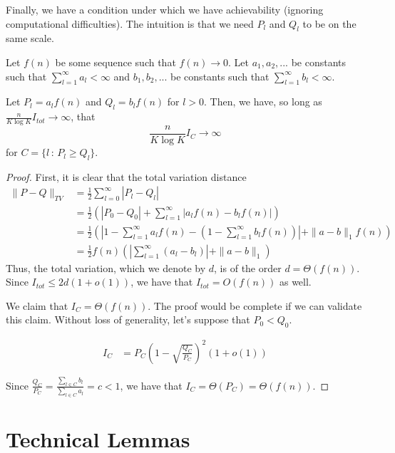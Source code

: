 \documentclass{article}
\begin{document}
Finally, we have a condition under which we have achievability (ignoring computational difficulties). The intuition is that we need $P_l$ and $Q_l$ to be on the same scale.

\begin{proposition}
Let $f(n)$ be some sequence such that $f(n) \rightarrow 0$. Let $a_1, a_2, ...$ be constants such that $\sum_{l=1}^\infty a_l < \infty$ and $b_1, b_2, ...$ be constants such that $\sum_{l=1}^\infty b_l < \infty$.

Let $P_l = a_l f(n)$ and $Q_l = b_l f(n)$ for $l > 0$. Then, we have, so long as $\frac{n}{K \log K} I_{tot} \rightarrow \infty$, that
\[
\frac{n}{K\log K} I_C \rightarrow \infty
\]
for $C = \{ l \,:\, P_l \geq Q_l \}$. 
\end{proposition}

\begin{proof}
First, it is clear that the total variation distance 
\begin{align*}
\| P - Q \|_{TV} &= \frac{1}{2} \sum_{l=0}^\infty | P_l - Q_l | \\
   &= \frac{1}{2} \left( |P_0 - Q_0| + \sum_{l=1}^\infty | a_l f(n) - b_l f(n) | \right) \\
 &= \frac{1}{2} \left( | 1 - \sum_{l=1}^\infty a_l f(n) - (1 - \sum_{l=1}^\infty b_l f(n)) | + \| a - b \|_1 f(n) \right) \\
 &= \frac{1}{2} f(n) \left( | \sum_{l=1}^\infty (a_l - b_l) | +  \| a - b \|_1 \right) 
\end{align*}
Thus, the total variation, which we denote by $d$, is of the order $d = \Theta(f(n))$. Since $I_{tot} \leq 2d (1 + o(1))$, we have that $I_{tot} = O( f(n))$ as well.

We claim that $I_C = \Theta( f(n))$. The proof would be complete if we can validate this claim. Without loss of generality, let's suppose that $P_0 < Q_0$. 

\begin{align*}
I_C &= P_C \left( 1 - \sqrt{ \frac{Q_C}{P_C} } \right)^2 (1 + o(1)) 
\end{align*}

Since $\frac{Q_C}{P_C} = \frac{\sum_{l \in C} b_l}{\sum_{l \in C} a_l} = c < 1$, we have that $I_C = \Theta(P_C) = \Theta(f(n))$.

\end{proof}

\section{Technical Lemmas}
\end{document}
